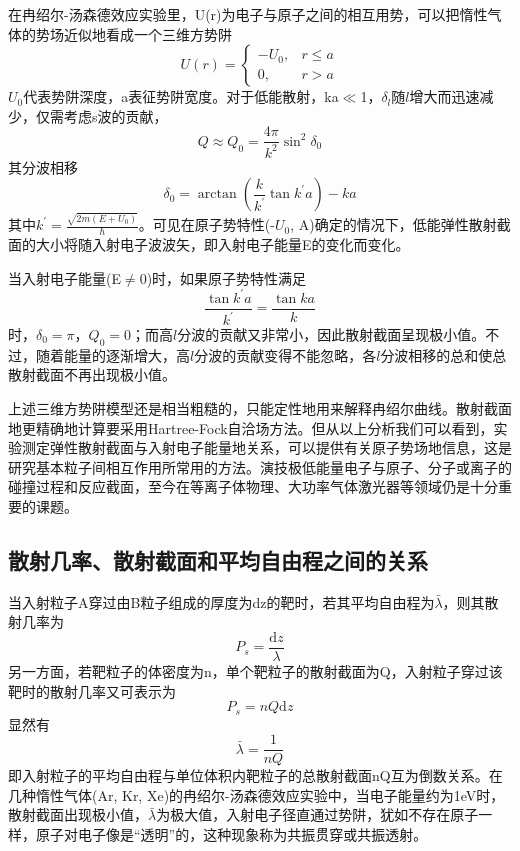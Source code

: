 \documentclass[a4paper]{article}
\begin{document}
在冉绍尔-汤森德效应实验里，U(r)为电子与原子之间的相互用势，可以把惰性气体的势场近似地看成一个三维方势阱
\begin{equation}
U(r) =
\begin{cases}
-U_0, & r\leq a \\
0, & r>a
\end{cases}
\label{eq6}
\end{equation}
$U_0$代表势阱深度，a表征势阱宽度。对于低能散射，ka$\ll$1，$\delta_l$随$l$增大而迅速减少，仅需考虑s波的贡献，
\begin{equation}
Q\approx Q_0 = \frac{4\pi}{k^2}\sin^2\delta_0\label{eq7}
\end{equation}
其分波相移
\begin{equation}
\delta_0 = \arctan(\frac{k}{k^{'}}\tan k^{'}a) - ka\label{eq8}
\end{equation}
其中$k^{'} = \frac{\sqrt{2m(E+U_0)}}{\hbar}$。可见在原子势特性(-$U_0$, A)确定的情况下，低能弹性散射截面的大小将随入射电子波波矢，即入射电子能量E的变化而变化。

当入射电子能量(E$\neq$0)时，如果原子势特性满足
\begin{equation*}
\frac{\tan k^{'}a}{k^{'}} = \frac{\tan ka}{k}
\end{equation*}
时，$\delta_0= \pi$，$Q_0= 0$；而高$l$分波的贡献又非常小，因此散射截面呈现极小值。不过，随着能量的逐渐增大，高$l$分波的贡献变得不能忽略，各$l$分波相移的总和使总散射截面不再出现极小值。

上述三维方势阱模型还是相当粗糙的，只能定性地用来解释冉绍尔曲线。散射截面地更精确地计算要采用Hartree-Fock自洽场方法。但从以上分析我们可以看到，实验测定弹性散射截面与入射电子能量地关系，可以提供有关原子势场地信息，这是研究基本粒子间相互作用所常用的方法。演技极低能量电子与原子、分子或离子的碰撞过程和反应截面，至今在等离子体物理、大功率气体激光器等领域仍是十分重要的课题。
\subsection{散射几率、散射截面和平均自由程之间的关系}
当入射粒子A穿过由B粒子组成的厚度为dz的靶时，若其平均自由程为$\bar{\lambda}$，则其散射几率为
\begin{equation*}
P_s = \frac{\text{d}z}{\lambda}
\end{equation*}
另一方面，若靶粒子的体密度为n，单个靶粒子的散射截面为Q，入射粒子穿过该靶时的散射几率又可表示为
\begin{equation*}
P_s = nQ\text{d}z
\end{equation*}
显然有
\begin{equation}
\bar{\lambda} = \frac{1}{nQ}\label{eq9}
\end{equation}
即入射粒子的平均自由程与单位体积内靶粒子的总散射截面nQ互为倒数关系。在几种惰性气体(Ar, Kr, Xe)的冉绍尔-汤森德效应实验中，当电子能量约为1eV时，散射截面出现极小值，$\bar{\lambda}$为极大值，入射电子径直通过势阱，犹如不存在原子一样，原子对电子像是“透明”的，这种现象称为共振贯穿或共振透射。
\end{document}
